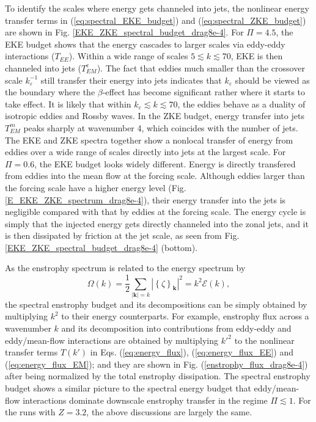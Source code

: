 \documentclass{ametsoc}
\begin{document}
To identify the scales where energy gets channeled into jets, the nonlinear 
energy transfer terms in (\ref{eq:spectral_EKE_budget}) and 
(\ref{eq:spectral_ZKE_budget}) are shown in Fig. \ref{EKE_ZKE_spectral_budget_drag8e-4}.
For $\Pi=4.5$, the EKE budget shows that the energy cascades to larger scales
via eddy-eddy interactions ($T_{EE}$). Within a wide range 
of scales $5\apprle k\apprle70$, EKE is then channeled into jets 
($T^e_{EM}$). The fact that eddies much smaller
than the crossover scale $k_{\varepsilon}^{-1}$ still transfer their
energy into jets indicates that $k_{\varepsilon}$ should
be viewed as the boundary where the $\beta$-effect has become significant rather where it
starts to take effect. It is likely that within $k_{\varepsilon}\apprle k\apprle70$,
the eddies behave as a duality of isotropic eddies and Rossby waves.
In the ZKE budget, energy transfer into jets $T_{EM}^{m}$ peaks
sharply at wavenumber 4, which coincides with the number of jets. The
EKE and ZKE spectra together show a nonlocal transfer of energy from
eddies over a wide range of scales directly into jets at the largest scale.
For $\Pi=0.6$, the EKE budget looks widely different. Energy is directly
transfered from eddies into the mean flow at the forcing scale. Although
eddies larger than the forcing scale have a higher energy level (Fig.
\ref{E_EKE_ZKE_spectrum_drag8e-4}), their energy transfer into the
jets is negligible compared with that by eddies at the forcing scale.
The energy cycle is simply that the injected energy gets directly 
channeled into the zonal jets, and it is then dissipated by friction
at the jet scale, as seen from Fig. \ref{EKE_ZKE_spectral_budget_drag8e-4} (bottom). 

As the enstrophy spectrum is related to the energy spectrum by
\begin{equation}
    \Omega(k)= \frac{1}{2}\underset{|\mathbf{k}|=k}{\sum}|\left\{ \zeta\right\} _{\mathbf{k}}|^{2} = k^2 \mathcal{E}(k),
\end{equation}
the spectral enstrophy budget and its decompositions can be simply
obtained by multiplying $k^2$ to their energy counterparts.
For example, enstrophy flux across a wavenumber $k$ and its decomposition 
into contributions from eddy-eddy and eddy/mean-flow interactions are 
obtained by multiplying $k'^2$ to the nonlinear transfer terms $T(k')$ 
in Eqs. (\ref{eq:energy_flux}), (\ref{eq:energy_flux_EE}) and (\ref{eq:energy_flux_EM});
and they are shown in Fig. (\ref{enstrophy_flux_drag8e-4}) after being 
normalized by the total enstrophy dissipation. The spectral enstrophy
budget shows a similar picture to the spectral energy budget 
that eddy/mean-flow interactions dominate downscale 
enstrophy transfer in the regime $\Pi\apprle 1$. For the runs with $Z=3.2$, 
the above discussions are largely the same. 
\end{document}
